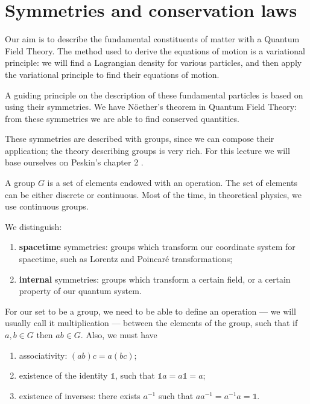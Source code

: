 \documentclass[main.tex]{subfiles}
\begin{document}
\section{Symmetries and conservation laws}


Our aim is to describe the fundamental constituents of matter with a Quantum Field Theory. 
The method used to derive the equations of motion is a variational principle: we will find a Lagrangian density for various particles, and then apply the variational principle to find their equations of motion. 

A guiding principle on the description of these fundamental particles is based on using their symmetries. 
We have Nöether's theorem in Quantum Field Theory: from these symmetries we are able to find conserved quantities. 

These symmetries are described with groups, since we can compose their application; the theory describing groups is very rich. 
For this lecture we will base ourselves on Peskin's chapter 2 \cite[]{peskinConceptsElementaryParticle2019}. 

A group \(G\) is a set of elements endowed with an operation. The set of elements can be either discrete or continuous. Most of the time, in theoretical physics, we use continuous groups. 

We distinguish: 
\begin{enumerate}
  \item \textbf{spacetime} symmetries: groups which transform our coordinate system for spacetime, such as Lorentz and Poincaré transformations;
  \item \textbf{internal} symmetries: groups which transform a certain field, or a certain property of our quantum system.
\end{enumerate}

For our set to be a group, we need to be able to define an operation --- we will usually call it multiplication --- between the elements of the group, such that if \(a, b \in G\) then \(ab \in G\). Also, we must have 
\begin{enumerate}
  \item associativity: \((ab)c = a(bc)\);
  \item existence of the identity \(\mathbb{1}\), such that \(\mathbb{1} a = a \mathbb{1} = a\);
  \item existence of inverses: there exists \(a^{-1}\) such that \(a a^{-1} = a^{-1} a = \mathbb{1}\). 
\end{enumerate}
\end{document}
